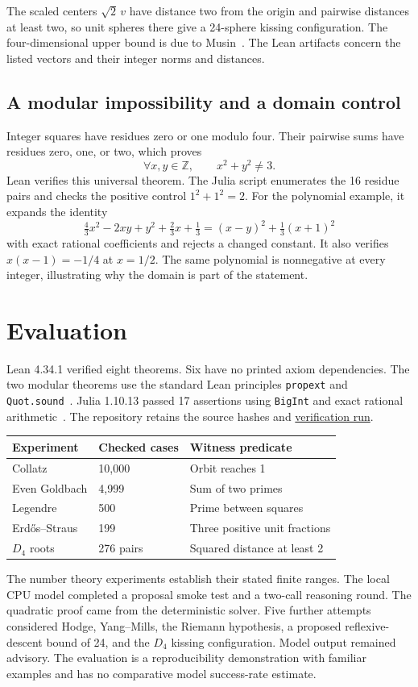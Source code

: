\documentclass[11pt]{article}
\begin{document}
The scaled centers $\sqrt{2}\,v$ have distance two from the origin and pairwise distances at least two, so unit spheres there give a 24-sphere kissing configuration. The four-dimensional upper bound is due to Musin~\cite{musin}. The Lean artifacts concern the listed vectors and their integer norms and distances.

\subsection{A modular impossibility and a domain control}
Integer squares have residues zero or one modulo four. Their pairwise sums have residues zero, one, or two, which proves
\[
\forall x,y\in\mathbb Z,\qquad x^2+y^2\ne 3.
\]
Lean verifies this universal theorem. The Julia script enumerates the 16 residue pairs and checks the positive control $1^2+1^2=2$. For the polynomial example, it expands the identity
\[
\tfrac43x^2-2xy+y^2+\tfrac23x+\tfrac13=(x-y)^2+\tfrac13(x+1)^2
\]
with exact rational coefficients and rejects a changed constant. It also verifies $x(x-1)=-1/4$ at $x=1/2$. The same polynomial is nonnegative at every integer, illustrating why the domain is part of the statement.

\section{Evaluation}
Lean 4.34.1 verified eight theorems. Six have no printed axiom dependencies. The two modular theorems use the standard Lean principles \texttt{propext} and \texttt{Quot.sound}~\cite{lean}. Julia 1.10.13 passed 17 assertions using \texttt{BigInt} and exact rational arithmetic~\cite{julia}. The repository retains the source hashes and \href{https://github.com/creelie/Anaxia-Research/actions/runs/43609560559}{verification run}.

\begin{center}
\begin{tabular}{lll}
\toprule
Experiment & Checked cases & Witness predicate \\
\midrule
Collatz & 10,000 & Orbit reaches 1 \\
Even Goldbach & 4,999 & Sum of two primes \\
Legendre & 500 & Prime between squares \\
Erd\H{o}s--Straus & 199 & Three positive unit fractions \\
$D_4$ roots & 276 pairs & Squared distance at least 2 \\
\bottomrule
\end{tabular}
\end{center}
The number theory experiments establish their stated finite ranges. The local CPU model completed a proposal smoke test and a two-call reasoning round. The quadratic proof came from the deterministic solver. Five further attempts considered Hodge, Yang--Mills, the Riemann hypothesis, a proposed reflexive-descent bound of 24, and the $D_4$ kissing configuration. Model output remained advisory. The evaluation is a reproducibility demonstration with familiar examples and has no comparative model success-rate estimate.
\end{document}
